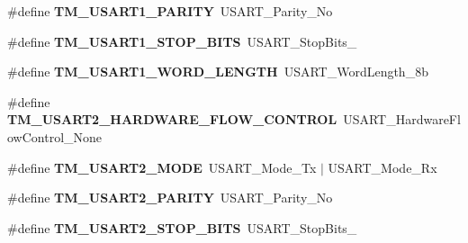 \begin{DoxyCompactItemize}
\item 
\hypertarget{group___t_m___u_s_a_r_t___macros_gad8d45571ec9fd839050d2829347783cf}{}\#define {\bfseries T\+M\+\_\+\+U\+S\+A\+R\+T1\+\_\+\+P\+A\+R\+I\+T\+Y}~U\+S\+A\+R\+T\+\_\+\+Parity\+\_\+\+No\label{group___t_m___u_s_a_r_t___macros_gad8d45571ec9fd839050d2829347783cf}

\item 
\hypertarget{group___t_m___u_s_a_r_t___macros_gaccdbd50b3ea6c51269e7dbf8e56acfe1}{}\#define {\bfseries T\+M\+\_\+\+U\+S\+A\+R\+T1\+\_\+\+S\+T\+O\+P\+\_\+\+B\+I\+T\+S}~U\+S\+A\+R\+T\+\_\+\+Stop\+Bits\+\_\label{group___t_m___u_s_a_r_t___macros_gaccdbd50b3ea6c51269e7dbf8e56acfe1}

\item 
\hypertarget{group___t_m___u_s_a_r_t___macros_ga999b4d7386c9062c39f60bee7497edab}{}\#define {\bfseries T\+M\+\_\+\+U\+S\+A\+R\+T1\+\_\+\+W\+O\+R\+D\+\_\+\+L\+E\+N\+G\+T\+H}~U\+S\+A\+R\+T\+\_\+\+Word\+Length\+\_\+8b\label{group___t_m___u_s_a_r_t___macros_ga999b4d7386c9062c39f60bee7497edab}

\item 
\hypertarget{group___t_m___u_s_a_r_t___macros_ga58875f6413583dc7ed57aaa7984f04e8}{}\#define {\bfseries T\+M\+\_\+\+U\+S\+A\+R\+T2\+\_\+\+H\+A\+R\+D\+W\+A\+R\+E\+\_\+\+F\+L\+O\+W\+\_\+\+C\+O\+N\+T\+R\+O\+L}~U\+S\+A\+R\+T\+\_\+\+Hardware\+Flow\+Control\+\_\+\+None\label{group___t_m___u_s_a_r_t___macros_ga58875f6413583dc7ed57aaa7984f04e8}

\item 
\hypertarget{group___t_m___u_s_a_r_t___macros_ga6c98a084d419d9f616856157e8e200e2}{}\#define {\bfseries T\+M\+\_\+\+U\+S\+A\+R\+T2\+\_\+\+M\+O\+D\+E}~U\+S\+A\+R\+T\+\_\+\+Mode\+\_\+\+Tx $\vert$ U\+S\+A\+R\+T\+\_\+\+Mode\+\_\+\+Rx\label{group___t_m___u_s_a_r_t___macros_ga6c98a084d419d9f616856157e8e200e2}

\item 
\hypertarget{group___t_m___u_s_a_r_t___macros_gae23c8e55067614c84626275f5312b80a}{}\#define {\bfseries T\+M\+\_\+\+U\+S\+A\+R\+T2\+\_\+\+P\+A\+R\+I\+T\+Y}~U\+S\+A\+R\+T\+\_\+\+Parity\+\_\+\+No\label{group___t_m___u_s_a_r_t___macros_gae23c8e55067614c84626275f5312b80a}

\item 
\hypertarget{group___t_m___u_s_a_r_t___macros_gad7d002cf3519611eaf9660a88aaedb0f}{}\#define {\bfseries T\+M\+\_\+\+U\+S\+A\+R\+T2\+\_\+\+S\+T\+O\+P\+\_\+\+B\+I\+T\+S}~U\+S\+A\+R\+T\+\_\+\+Stop\+Bits\+\_\label{group___t_m___u_s_a_r_t___macros_gad7d002cf3519611eaf9660a88aaedb0f}


\end{DoxyCompactItemize}
